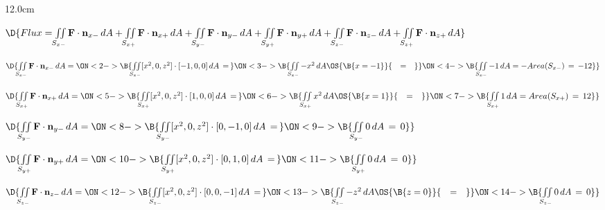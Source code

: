 \begin{frame}
\frametitle{}
\scriptsize
\begin{columns}
\begin{column}{12.0cm}

$\D{Flux = \iint \limits_{S_{x-}} {\bf F} \cdot {\bf n}_{x-}\, dA + \iint \limits_{S_{x+}} {\bf F} \cdot {\bf n}_{x+}\, dA + \iint \limits_{S_{y-}} {\bf F} \cdot {\bf n}_{y-}\, dA + \iint \limits_{S_{y+}} {\bf F} \cdot {\bf n}_{y+}\, dA + \iint \limits_{S_{z-}} {\bf F} \cdot {\bf n}_{z-}\, dA + \iint \limits_{S_{z+}} {\bf F} \cdot {\bf n}_{z+}\, dA}$

\vspace{0.4cm}

$\D{\iint \limits_{S_{x-}} {\bf F} \cdot {\bf n}_{x-}\, dA = 
\ON<2->{\B{\iint \limits_{S_{x-}} [x^2,0,z^2] \cdot [-1,0,0]\, dA \,=\, }}
\ON<3->{\B{\iint \limits_{S_{x-}} -x^2 \, dA \OS{\B{x=-1}}{\quad=\quad} }}
\ON<4->{\B{\iint \limits_{S_{x-}} -1 \, dA = -Area(S_{x-}) \,=\, -12}}}$

\vspace{0.2cm}

$\D{\iint \limits_{S_{x+}} {\bf F} \cdot {\bf n}_{x+}\, dA = 
\ON<5->{\B{\iint \limits_{S_{x+}} [x^2,0,z^2] \cdot [1,0,0]\, dA \,=\, }}
\ON<6->{\B{\iint \limits_{S_{x+}} x^2 \, dA \OS{\B{x=1}}{\quad=\quad} }}
\ON<7->{\B{\iint \limits_{S_{x+}} 1 \, dA = Area(S_{x+}) \,=\, 12}}}$

\vspace{0.2cm}

$\D{\iint \limits_{S_{y-}} {\bf F} \cdot {\bf n}_{y-}\, dA = 
\ON<8->{\B{\iint \limits_{S_{y-}} [x^2,0,z^2] \cdot [0,-1,0]\, dA \,=\,}}
\ON<9->{\B{\iint \limits_{S_{y-}} 0 \, dA \, = \, 0 }}}$

\vspace{0.2cm}

$\D{\iint \limits_{S_{y+}} {\bf F} \cdot {\bf n}_{y+}\, dA = 
\ON<10->{\B{\iint \limits_{S_{y+}} [x^2,0,z^2] \cdot [0,1,0]\, dA \,=\,}}
\ON<11->{\B{\iint \limits_{S_{y+}} 0 \, dA \, = \, 0 }}}$

\vspace{0.2cm}

$\D{\iint \limits_{S_{z-}} {\bf F} \cdot {\bf n}_{z-}\, dA = 
\ON<12->{\B{\iint \limits_{S_{z-}} [x^2,0,z^2] \cdot [0,0,-1]\, dA \,=\, }}
\ON<13->{\B{\iint \limits_{S_{z-}} -z^2 \, dA \OS{\B{z=0}}{\quad=\quad} }}
\ON<14->{\B{\iint \limits_{S_{z-}} 0 \, dA \,=\, 0}}}$

\vspace{0.2cm}


\end{column}
\end{columns}
\end{frame}
